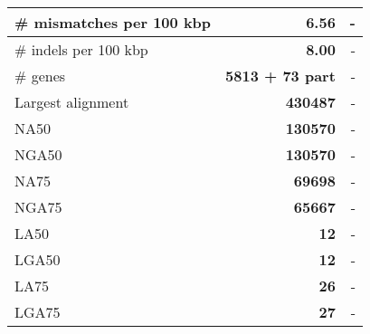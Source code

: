 \documentclass[12pt,a4paper]{article}
\begin{document}
\begin{table}[ht]
\begin{center}
\begin{tabular}{|l*{2}{|r}|}
\# mismatches per 100 kbp & {\bf 6.56} & - \\ \hline
\# indels per 100 kbp & {\bf 8.00} & - \\ \hline
\# genes & {\bf 5813 + 73 part} & - \\ \hline
Largest alignment & {\bf 430487} & - \\ \hline
NA50 & {\bf 130570} & - \\ \hline
NGA50 & {\bf 130570} & - \\ \hline
NA75 & {\bf 69698} & - \\ \hline
NGA75 & {\bf 65667} & - \\ \hline
LA50 & {\bf 12} & - \\ \hline
LGA50 & {\bf 12} & - \\ \hline
LA75 & {\bf 26} & - \\ \hline
LGA75 & {\bf 27} & - \\ \hline
\end{tabular}
\end{center}
\end{table}
\end{document}
